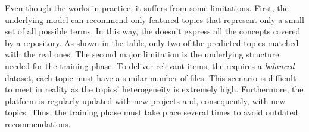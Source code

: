 Even though the \MNB works in practice, it suffers from some limitations. First, the underlying model can recommend only featured topics that represent only a small set of all possible terms. In this way, the \MNB doesn't express all the concepts covered by a \GH repository. As shown in the table, only two of the predicted topics matched with the real ones. The second major limitation is the underlying structure needed for the training phase. To deliver relevant items, the \MNB requires a \emph{balanced} dataset, \ie each topic must have a similar number of  \RM files. This scenario is difficult to meet in reality as the topics' heterogeneity is extremely high. Furthermore, the \GH platform is regularly updated with new projects and, consequently, with new topics. Thus, the training phase must take place several times to avoid outdated recommendations. 